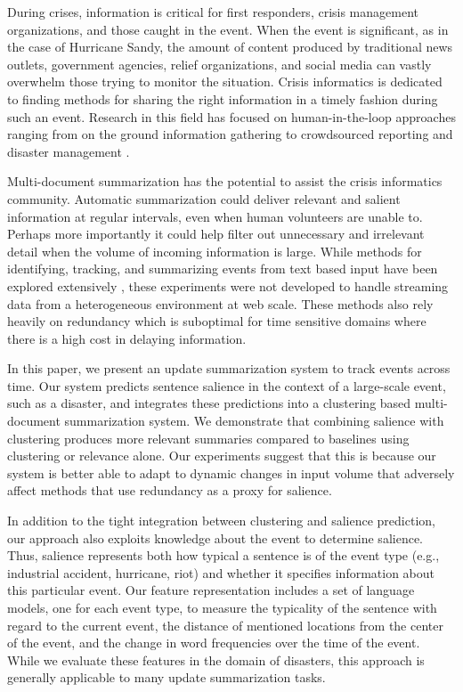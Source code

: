 \label{sec:introduction}

During crises, information is critical for first responders, crisis management
organizations, and those caught in the event. When the event is significant, 
as in the case of Hurricane Sandy, the amount of content produced by 
traditional news outlets, government agencies, relief organizations, and 
social media can vastly overwhelm those trying to monitor the situation. 
Crisis informatics \cite{palen2010vision} is dedicated to finding methods for 
sharing the right information in a timely fashion during such an event.
Research in this field has focused on human-in-the-loop approaches ranging 
from on the ground information gathering to crowdsourced reporting and 
disaster management \cite{starbird2013working}.


Multi-document summarization has the potential to assist the crisis 
informatics community. Automatic summarization could deliver relevant and 
salient information at regular intervals, even when human volunteers are 
unable to. Perhaps more importantly it could help filter out unnecessary and 
irrelevant detail when the volume of incoming information is large. While 
methods for identifying, tracking, and summarizing events from text based 
input have been explored extensively
\cite{allan1998topic,Filatova&Hatzivassiloglou.04a,Wang&al.11}, 
these experiments were not developed to handle streaming data from a
heterogeneous environment at web scale. These methods also rely heavily on 
redundancy which is suboptimal for time sensitive domains where there is a 
high cost in delaying information.


In this paper, we present an update summarization system to track events
across time. Our system predicts sentence salience in the context of a
large-scale event, such as a disaster, and integrates these predictions into
a clustering based multi-document summarization system. We demonstrate that 
combining salience with clustering produces more relevant summaries compared 
to baselines using clustering or relevance alone.  Our experiments suggest 
that this is because our system is better able to adapt to dynamic changes in 
input volume that adversely affect methods that use redundancy as a proxy for 
salience. 


In addition to the tight integration between clustering and salience
prediction, our approach also exploits knowledge about the event to determine
salience. Thus, salience represents both how typical a sentence is of the  
event
type (e.g., industrial accident, hurricane, riot) and whether it specifies 
information
about this particular event. 
Our feature representation includes a set of language models, one for each
event type, to measure the typicality of the sentence with regard to the 
current event, the distance of mentioned locations from the center of
the event, and the change in word frequencies over the time of the event.
While we evaluate these features in the domain of disasters, this approach is 
generally applicable to many update summarization tasks.


